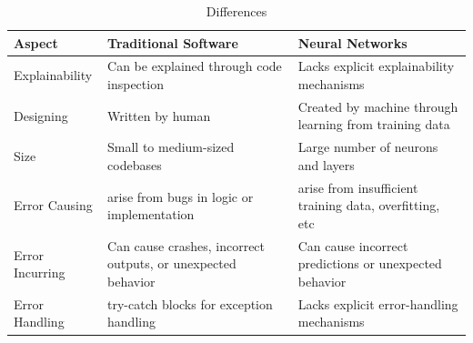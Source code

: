 \documentclass[oneside,11pt,dvipsnames]{book}
\begin{document}
\begin{table}
    \caption{Differences}\label{tab:nn-software-differences}
    \scriptsize
    \centering
\begin{tabular}{l|l|l}
    \toprule
    Aspect	& Traditional Software	& Neural Networks \\
    \midrule
    Explainability & Can be explained through code inspection & Lacks explicit explainability mechanisms\\
    Designing &	Written by human & Created by machine through learning from training data\\
    Size & Small to medium-sized codebases & Large number of neurons and layers\\
    Error Causing & arise from bugs in logic or implementation & arise from insufficient training data, overfitting, etc\\
    Error Incurring & Can cause crashes, incorrect outputs, or unexpected behavior & Can cause incorrect predictions or unexpected behavior\\
    Error Handling & try-catch blocks for exception handling &	Lacks explicit error-handling mechanisms\\

\end{tabular}
\end{table}
\end{document}
